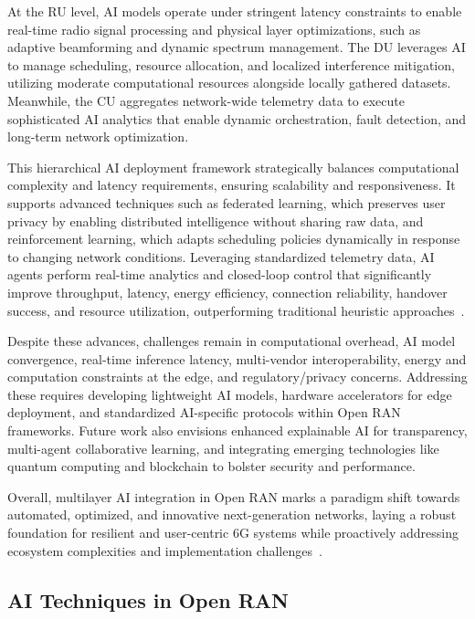\documentclass[sigconf]{acmart}
\begin{document}
At the RU level, AI models operate under stringent latency constraints to enable real-time radio signal processing and physical layer optimizations, such as adaptive beamforming and dynamic spectrum management. The DU leverages AI to manage scheduling, resource allocation, and localized interference mitigation, utilizing moderate computational resources alongside locally gathered datasets. Meanwhile, the CU aggregates network-wide telemetry data to execute sophisticated AI analytics that enable dynamic orchestration, fault detection, and long-term network optimization.

This hierarchical AI deployment framework strategically balances computational complexity and latency requirements, ensuring scalability and responsiveness. It supports advanced techniques such as federated learning, which preserves user privacy by enabling distributed intelligence without sharing raw data, and reinforcement learning, which adapts scheduling policies dynamically in response to changing network conditions. Leveraging standardized telemetry data, AI agents perform real-time analytics and closed-loop control that significantly improve throughput, latency, energy efficiency, connection reliability, handover success, and resource utilization, outperforming traditional heuristic approaches~\cite{ref54}.

Despite these advances, challenges remain in computational overhead, AI model convergence, real-time inference latency, multi-vendor interoperability, energy and computation constraints at the edge, and regulatory/privacy concerns. Addressing these requires developing lightweight AI models, hardware accelerators for edge deployment, and standardized AI-specific protocols within Open RAN frameworks. Future work also envisions enhanced explainable AI for transparency, multi-agent collaborative learning, and integrating emerging technologies like quantum computing and blockchain to bolster security and performance.

Overall, multilayer AI integration in Open RAN marks a paradigm shift towards automated, optimized, and innovative next-generation networks, laying a robust foundation for resilient and user-centric 6G systems while proactively addressing ecosystem complexities and implementation challenges~\cite{ref54}.

\subsection{AI Techniques in Open RAN}
\end{document}
